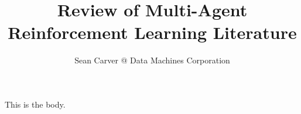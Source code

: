 \documentclass{article}
\title{Review of Multi-Agent Reinforcement Learning Literature}
\author{Sean Carver @ Data Machines Corporation}
\begin{document}
\maketitle

This is the body.

\nocite{*}



\end{document}
